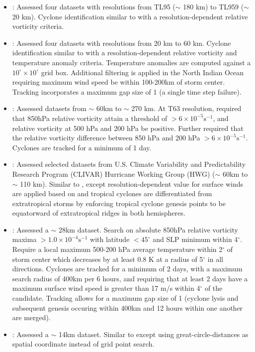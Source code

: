 \documentclass[gmdd, hvmath, online]{copernicus_discussions}
\begin{document}
\begin{itemize}
\item \cite{murakami2010effect}:  Assessed four datasets with resolutions from TL95 ($\sim$ 180 km) to TL959 ($\sim$ 20 km).  Cyclone identification similar to \cite{oouchi2006tropical} with a resolution-dependent relative vorticity criteria.

\item \cite{murakami2012future}:  Assessed four datasets with resolutions from 20 km to 60 km.  Cyclone identification similar to \cite{oouchi2006tropical} with a resolution-dependent relative vorticity and temperature anomaly criteria.  Temperature anomalies are computed against a $10^\circ \times 10^\circ$ grid box.  Additional filtering is applied in the North Indian Ocean requiring maximum wind speed be within 100-200km of storm center.  Tracking incorporates a maximum gap size of 1 (a single time step failure).

\item \cite{strachan2013investigating}:  Assessed datasets from $\sim$ 60km to $\sim$ 270 km.  At T63 resolution, required that 850hPa relative vorticity attain a threshold of $> 6 \times 10^{-5} \mbox{s}^{-1}$, and relative vorticity at 500 hPa and 200 hPa be positive.  Further required that the relative vorticity difference between 850 hPa and 200 hPa $> 6 \times 10^{-5} \mbox{s}^{-1}$.  Cyclones are tracked for a minimum of 1 day.

\item \cite{horn2014tracking}:  Assessed selected datasets from U.S. Climate Variability and Predictability Research Program (CLIVAR) Hurricane Working Group (HWG) \citep{Walsh2015CLIVAR} ($\sim$ 60km to $\sim$ 110 km). Similar to \citet{walsh2004fine}, except resolution-dependent value for surface winds are applied based on \citet{walsh2007objectively} and tropical cyclones are differentiated from extratropical storms by enforcing tropical cyclone genesis points to be equatorward of extratropical ridges in both hemispheres.

\item \cite{zarzycki2014multidecadal}:  Assessed a $\sim$ 28km dataset.  Search on absolute 850hPa relative vorticity maxima $> 1.0 \times 10^{-4} \mbox{s}^{-1}$ with latitude $< 45^\circ$ and SLP minimum within 4$^\circ$. Require a local maximum 500-200 hPa average temperature within 2$^\circ$ of storm center which decreases by at least 0.8 K at a radius of 5$^\circ$ in all directions.  Cyclones are tracked for a minimum of 2 days, with a maximum search radius of 400km per 6 hours, and requiring that at least 2 days have a maximum surface wind speed is greater than 17 m/s within 4$^\circ$ of the candidate. Tracking allows for a maximum gap size of 1 (cyclone lysis and subsequent genesis occuring within 400km and 12 hours within one another are merged).

\item \cite{bosler2016stride}:  Assessed a $\sim$ 14km dataset. Similar to \cite{knutson2007simulation, zhao2009simulations} except using great-circle-distances as spatial coordinate instead of grid point search.

\end{itemize}
\end{document}
